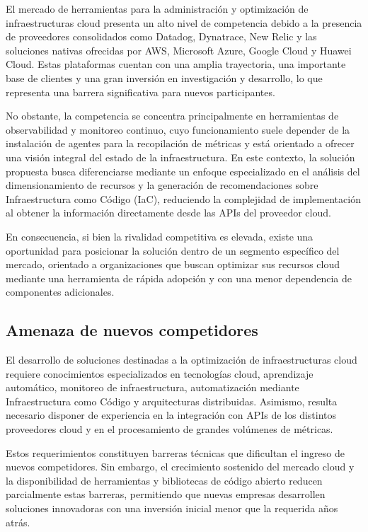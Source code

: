 El mercado de herramientas para la administración y optimización de infraestructuras cloud presenta un alto nivel de competencia debido a la presencia de proveedores consolidados como Datadog, Dynatrace, New Relic y las soluciones nativas ofrecidas por AWS, Microsoft Azure, Google Cloud y Huawei Cloud. Estas plataformas cuentan con una amplia trayectoria, una importante base de clientes y una gran inversión en investigación y desarrollo, lo que representa una barrera significativa para nuevos participantes.

No obstante, la competencia se concentra principalmente en herramientas de observabilidad y monitoreo continuo, cuyo funcionamiento suele depender de la instalación de agentes para la recopilación de métricas y está orientado a ofrecer una visión integral del estado de la infraestructura. En este contexto, la solución propuesta busca diferenciarse mediante un enfoque especializado en el análisis del dimensionamiento de recursos y la generación de recomendaciones sobre Infraestructura como Código (IaC), reduciendo la complejidad de implementación al obtener la información directamente desde las APIs del proveedor cloud.

En consecuencia, si bien la rivalidad competitiva es elevada, existe una oportunidad para posicionar la solución dentro de un segmento específico del mercado, orientado a organizaciones que buscan optimizar sus recursos cloud mediante una herramienta de rápida adopción y con una menor dependencia de componentes adicionales.

\subsection{Amenaza de nuevos competidores}

El desarrollo de soluciones destinadas a la optimización de infraestructuras cloud requiere conocimientos especializados en tecnologías cloud, aprendizaje automático, monitoreo de infraestructura, automatización mediante Infraestructura como Código y arquitecturas distribuidas. Asimismo, resulta necesario disponer de experiencia en la integración con APIs de los distintos proveedores cloud y en el procesamiento de grandes volúmenes de métricas.

Estos requerimientos constituyen barreras técnicas que dificultan el ingreso de nuevos competidores. Sin embargo, el crecimiento sostenido del mercado cloud y la disponibilidad de herramientas y bibliotecas de código abierto reducen parcialmente estas barreras, permitiendo que nuevas empresas desarrollen soluciones innovadoras con una inversión inicial menor que la requerida años atrás.

